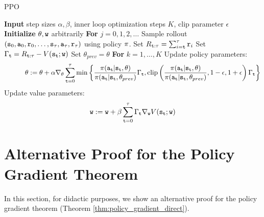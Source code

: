 \begin{algorithm}[H]
\caption{PPO}
\begin{algorithmic}[1]
\State \textbf{Input} step sizes $\alpha,\beta$, inner loop optimization steps $K$, clip parameter $\epsilon$
\State \textbf{Initialize} $\theta, {\tt w}$ arbitrarily
\State \textbf{For} $j = 0,1,2,\dots$
\State \quad Sample rollout $({\tt s}_0, {\tt a}_0, {\tt r}_0, \ldots, {\tt s}_\tau, {\tt a}_\tau, {\tt r}_\tau)$ using policy $\pi$.
\State \quad Set $R_{{\tt t}:\tau} = \sum_{i={\tt t}}^\tau {\tt r}_i$
\State \quad Set $\Gamma_{\tt t} = R_{{\tt t}:\tau}-V({\tt s}_{\tt t};{\tt w})$
\State \quad Set $\theta_{prev} = \theta$
\State \quad \textbf{For} $k=1,\dots,K$
\State \quad \quad \quad Update policy parameters:
\[
\quad \quad \quad \theta := \theta + \alpha \nabla_{\theta}\sum_{{\tt t}=0}^\tau \min \left\{\frac{\pi({\tt a}_{\tt t}|{\tt s}_{\tt t}, \theta)}{\pi({\tt a}_{\tt t}|{\tt s}_{\tt t}, \theta_{prev})}\Gamma_{\tt t},  \textrm{clip}\left(\frac{\pi({\tt a}_{\tt t}|{\tt s}_{\tt t}, \theta)}{\pi({\tt a}_{\tt t}|{\tt s}_{\tt t}, \theta_{prev})} , 1-\epsilon, 1+\epsilon\right)\Gamma_{\tt t} \right\}
\]
\State \quad Update value parameters:
\[
{\tt w} := {\tt w} + \beta \sum_{{\tt t}=0}^{\tau} \Gamma_{\tt t} \nabla_{{\tt w}} V({\tt s}_{\tt t};{\tt w})
\]
\end{algorithmic}
\end{algorithm}

\section{Alternative Proof for the Policy Gradient Theorem}\label{sec:alternative_proof}
In this section, for didactic purposes, we show an alternative proof for the policy gradient theorem (Theorem \ref{thm:policy_gradient_direct}). 

